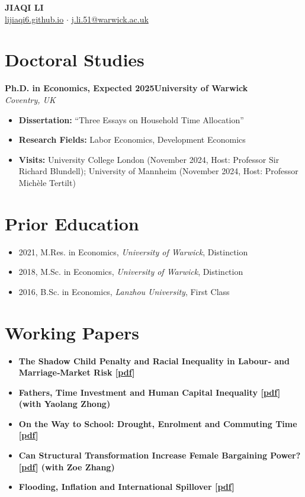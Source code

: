 \documentclass[11pt,a4paper]{article}
\newcommand{\cventry}[4]{
    \noindent\textbf{#1}\hfill\textbf{#2} \\
    \textit{#3}\hfill\textit{#4}
    \vspace{0.2em}
}
\newcommand{\cvitem}[2]{
    \item \textbf{#1} \\ #2
}
\begin{document}
\begin{center}
    {\Huge\bfseries JIAQI LI} \\
    \vspace{0.3em}
    \href{https://lijiaqi6.github.io/}{lijiaqi6.github.io} $\cdot$ \href{mailto:j.li.51@warwick.ac.uk}{j.li.51@warwick.ac.uk}
\end{center}
\vspace{1em}

\section{Doctoral Studies}
\cventry{Ph.D. in Economics, Expected 2025}{University of Warwick}{Coventry, UK}{}
\vspace{-0.5em}
\begin{itemize}[leftmargin=*, itemsep=0.2em]
    \item[] \textbf{Dissertation:} ``Three Essays on Household Time Allocation''
    \item[] \textbf{Research Fields:} Labor Economics, Development Economics
    \item[] \textbf{Visits:} University College London (November 2024, Host: Professor Sir Richard Blundell); University of Mannheim (November 2024, Host: Professor Michèle Tertilt)
\end{itemize}

\section{Prior Education}
\begin{itemize}[leftmargin=*, itemsep=0.2em]
    \item 2021, M.Res. in Economics, \textit{University of Warwick}, Distinction
    \item 2018, M.Sc. in Economics, \textit{University of Warwick}, Distinction
    \item 2016, B.Sc. in Economics, \textit{Lanzhou University}, First Class
\end{itemize}

\section{Working Papers}
\begin{itemize}[leftmargin=*, itemsep=0.3em]
    \cvitem{The Shadow Child Penalty and Racial Inequality in Labour‑ and Marriage‑Market Risk [\href{https://lijiaqi6.github.io/li_race.pdf}{pdf}]}{}
    \cvitem{Fathers, Time Investment and Human Capital Inequality [\href{https://lijiaqi6.github.io/Father.pdf}{pdf}] (with Yaolang Zhong)}{}
    \cvitem{On the Way to School: Drought, Enrolment and Commuting Time [\href{https://lijiaqi6.github.io/Drought.pdf}{pdf}]}{}
    \cvitem{Can Structural Transformation Increase Female Bargaining Power? [\href{https://papers.ssrn.com/sol3/papers.cfm?abstract_id=4955252}{pdf}] (with Zoe Zhang)}{}
    \cvitem{Flooding, Inflation and International Spillover [\href{https://papers.ssrn.com/sol3/papers.cfm?abstract_id=4816569}{pdf}]}{}
\end{itemize}
\end{document}
